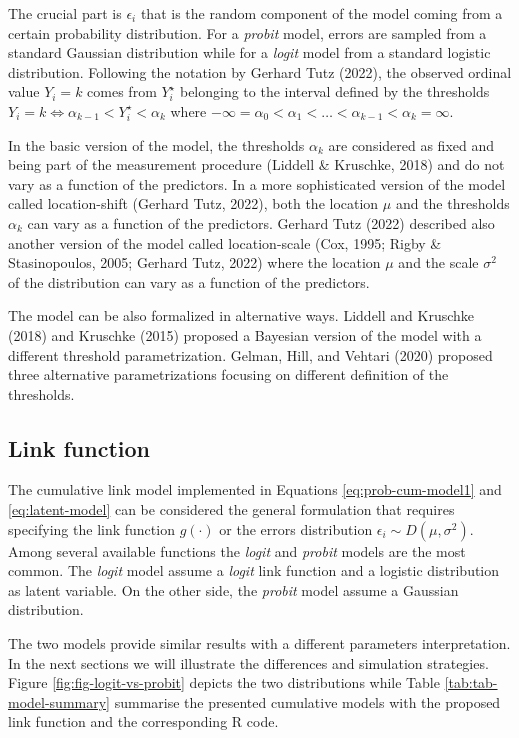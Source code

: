 \documentclass[
  man,floatsintext]{apa6}
\begin{document}
The crucial part is \(\epsilon_i\) that is the random component of the model coming from a certain probability distribution. For a \emph{probit} model, errors are sampled from a standard Gaussian distribution while for a \emph{logit} model from a standard logistic distribution. Following the notation by Gerhard Tutz (2022), the observed ordinal value \(Y_i = k\) comes from \(Y^\star_i\) belonging to the interval defined by the thresholds \(Y_i = k \iff \alpha_{k - 1} < Y^\star_i < \alpha_{k}\) where \(- \infty = \alpha_0 < \alpha_1 < \dots< \alpha_{k - 1} < \alpha_k = \infty\).

In the basic version of the model, the thresholds \(\alpha_k\) are considered as fixed and being part of the measurement procedure (Liddell \& Kruschke, 2018) and do not vary as a function of the predictors. In a more sophisticated version of the model called location-shift (Gerhard Tutz, 2022), both the location \(\mu\) and the thresholds \(\alpha_k\) can vary as a function of the predictors. Gerhard Tutz (2022) described also another version of the model called location-scale (Cox, 1995; Rigby \& Stasinopoulos, 2005; Gerhard Tutz, 2022) where the location \(\mu\) and the scale \(\sigma^2\) of the distribution can vary as a function of the predictors.

The model can be also formalized in alternative ways. Liddell and Kruschke (2018) and Kruschke (2015) proposed a Bayesian version of the model with a different threshold parametrization. Gelman, Hill, and Vehtari (2020) proposed three alternative parametrizations focusing on different definition of the thresholds.

\subsection{Link function}\label{link-function}

The cumulative link model implemented in Equations \eqref{eq:prob-cum-model1} and \eqref{eq:latent-model} can be considered the general formulation that requires specifying the link function \(g(\cdot)\) or the errors distribution \(\epsilon_i \sim D(\mu, \sigma^2)\). Among several available functions the \emph{logit} and \emph{probit} models are the most common. The \emph{logit} model assume a \emph{logit} link function and a logistic distribution as latent variable. On the other side, the \emph{probit} model assume a Gaussian distribution.

The two models provide similar results with a different parameters interpretation. In the next sections we will illustrate the differences and simulation strategies. Figure \ref{fig:fig-logit-vs-probit} depicts the two distributions while Table \ref{tab:tab-model-summary} summarise the presented cumulative models with the proposed link function and the corresponding R code.
\end{document}
